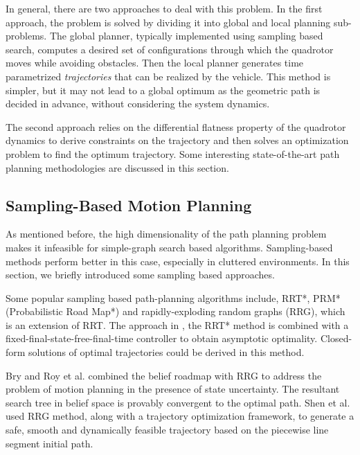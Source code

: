 In general, there are two approaches to deal with this problem. In the first approach, the problem is solved by dividing it into global and local planning sub-problems. The global planner, typically implemented using sampling based search, computes a desired set of configurations through which the quadrotor moves while avoiding obstacles. Then the local planner generates time parametrized \textit{trajectories} that can be realized by the vehicle. This method is simpler, but it may not lead to a global optimum as the geometric path is decided in advance, without considering the system dynamics. 

The second approach relies on the differential flatness \cite{mellinger2011minimum} property of the quadrotor dynamics to derive constraints on the trajectory and then solves an optimization problem to find the optimum trajectory. Some interesting state-of-the-art path planning methodologies are discussed in this section. 

\subsection{Sampling-Based Motion Planning}
\label{sec:sampling_planning}
As mentioned before, the high dimensionality of the path planning problem makes it infeasible for simple-graph search based algorithms. Sampling-based methods perform better in this case, especially in cluttered environments. In this section, we briefly introduced some sampling based approaches. 

Some popular sampling based path-planning algorithms include, RRT*, PRM* (Probabilistic Road Map*) and rapidly-exploding random graphs (RRG), which is an extension of RRT. The approach in \cite{webb2013kinodynamic}, the RRT* method is combined with a fixed-final-state-free-final-time controller to obtain asymptotic optimality. Closed-form solutions of optimal trajectories could be derived in this method. 

Bry and Roy et al. \cite{bry2011rapidly} combined the belief roadmap with RRG to address the problem of motion planning in the presence of state uncertainty. The resultant search tree in belief space is provably convergent to the optimal path. Shen et al. \cite{shen2017gradient} used RRG method, along with a trajectory optimization framework, to generate a safe, smooth and dynamically feasible trajectory based on the piecewise line segment initial path. 

